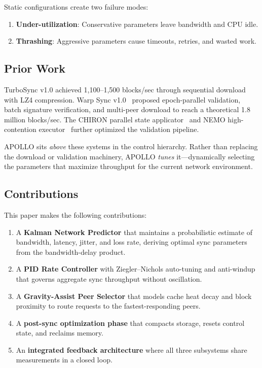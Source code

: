 \documentclass[11pt,a4paper]{article}
\begin{document}
Static configurations create two failure modes:
\begin{enumerate}
    \item \textbf{Under-utilization}: Conservative parameters leave bandwidth and CPU idle.
    \item \textbf{Thrashing}: Aggressive parameters cause timeouts, retries, and wasted work.
\end{enumerate}

\subsection{Prior Work}

TurboSync v1.0 achieved 1,100--1,500 blocks/sec through sequential download with LZ4 compression. Warp Sync v1.0~\cite{warpsync} proposed epoch-parallel validation, batch signature verification, and multi-peer download to reach a theoretical 1.8 million blocks/sec. The CHIRON parallel state applicator~\cite{chiron} and NEMO high-contention executor~\cite{nemo} further optimized the validation pipeline.

APOLLO sits \emph{above} these systems in the control hierarchy. Rather than replacing the download or validation machinery, APOLLO \emph{tunes} it---dynamically selecting the parameters that maximize throughput for the current network environment.

\subsection{Contributions}

This paper makes the following contributions:

\begin{enumerate}
    \item A \textbf{Kalman Network Predictor} that maintains a probabilistic estimate of bandwidth, latency, jitter, and loss rate, deriving optimal sync parameters from the bandwidth-delay product.
    \item A \textbf{PID Rate Controller} with Ziegler--Nichols auto-tuning and anti-windup that governs aggregate sync throughput without oscillation.
    \item A \textbf{Gravity-Assist Peer Selector} that models cache heat decay and block proximity to route requests to the fastest-responding peers.
    \item A \textbf{post-sync optimization phase} that compacts storage, resets control state, and reclaims memory.
    \item An \textbf{integrated feedback architecture} where all three subsystems share measurements in a closed loop.
\end{enumerate}
\end{document}
